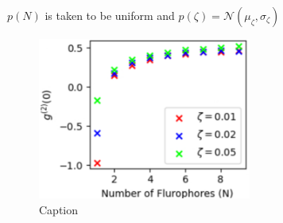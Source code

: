 \documentclass[a4paper, twocolumn, superscriptaddress,prl]{revtex4}  %
\begin{document}
$p(N)$ is taken to be uniform and $p(\zeta) = \mathcal{N}(\mu_{\zeta},\sigma_{\zeta})$

\begin{figure}
\includegraphics[width=7cm]{Figure-1.png}
\caption{Caption}
\end{figure}   


\clearpage
\end{document}
